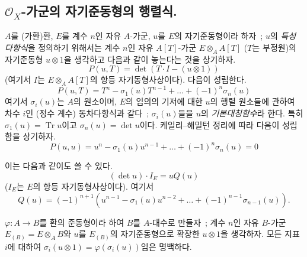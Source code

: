 \subsection{$\mathcal{O}_X$-가군의 자기준동형의 행렬식.}
\label{subsection:II.6.4-ko}

\begin{env}[6.4.1]
\label{II.6.4.1-ko}
$A$를 (가환)환, $E$를 계수 $n$인 자유 $A$-가군, $u$를 $E$의
자기준동형이라 하자~; $u$의 \emph{특성다항식}을 정의하기 위해서는
계수 $n$인 자유 $A[T]$-가군 $E\otimes_AA[T]$ ($T$는 부정원)의
자기준동형 $u\otimes1$을 생각하고 다음과 같이 놓는다는 것을 상기하자.
\[
\label{II.6.4.1.1-ko}
P(u,T)=\det(T\cdot I-(u\otimes1))
\tag{6.4.1.1}
\]
(여기서 $I$는 $E\otimes_AA[T]$의 항등 자기동형사상이다). 다음이
성립한다.
\[
\label{II.6.4.1.2-ko}
P(u,T)=T^n-\sigma_1(u)T^{n-1}+\ldots+(-1)^n\sigma_n(u)
\tag{6.4.1.2}
\]
여기서 $\sigma_i(u)$는 $A$의 원소이며, $E$의 임의의 기저에 대한
$u$의 행렬 원소들에 관하여 차수 $i$인 (정수 계수) 동차다항식과 같다~;
$\sigma_i(u)$들을 $u$의 \emph{기본대칭함수}라 한다. 특히
$\sigma_1(u)=\operatorname{Tr}u$이고 $\sigma_n(u)=\det u$이다.
케일리--해밀턴 정리에 따라 다음이 성립함을 상기하자.
\[
\label{II.6.4.1.3-ko}
P(u,u)=u^n-\sigma_1(u)u^{n-1}+\ldots+(-1)^n\sigma_n(u)=0
\tag{6.4.1.3}
\]


이는 다음과 같이도 쓸 수 있다.
\[
\label{II.6.4.1.4-ko}
(\det u)\cdot I_E=uQ(u)
\tag{6.4.1.4}
\]
($I_E$는 $E$의 항등 자기동형사상이다). 여기서
\[
\label{II.6.4.1.5-ko}
Q(u)=(-1)^{n+1}(u^{n-1}-\sigma_1(u)u^{n-2}+\ldots+(-1)^{n-1}\sigma_{n-1}(u)).
\tag{6.4.1.5}
\]

$\varphi:A\to B$를 환의 준동형이라 하여 $B$를 $A$-대수로 만들자~;
계수 $n$인 자유 $B$-가군 $E_{(B)}=E\otimes_AB$와 $u$를
$E_{(B)}$의 자기준동형으로 확장한 $u\otimes1$을 생각하자. 모든 지표
$i$에 대하여 $\sigma_i(u\otimes1)=\varphi(\sigma_i(u))$임은 명백하다.
\end{env}

